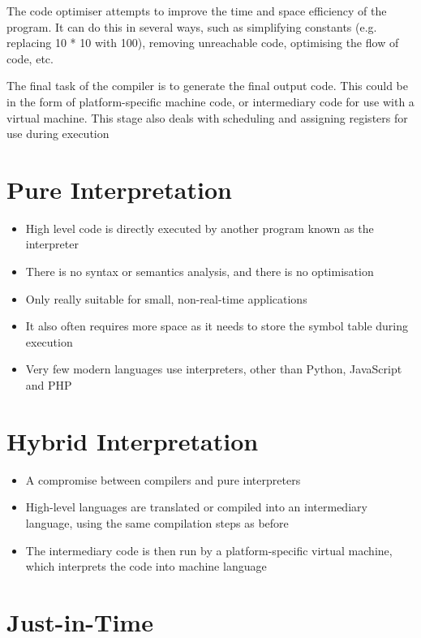 The code optimiser attempts to improve the time and space efficiency of the program. It can do this in several ways,
 such as simplifying constants (e.g. replacing 10 * 10 with 100), removing unreachable code, optimising the flow of
 code, etc.

The final task of the compiler is to generate the final output code. This could be in the form of platform-specific
 machine code, or intermediary code for use with a virtual machine. This stage also deals with scheduling and assigning
 registers for use during execution

\section*{Pure Interpretation}

\begin{itemize}
  \item High level code is directly executed by another program known as the interpreter
  \item There is no syntax or semantics analysis, and there is no optimisation
  \item Only really suitable for small, non-real-time applications
  \item It also often requires more space as it needs to store the symbol table during execution
  \item Very few modern languages use interpreters, other than Python, JavaScript and PHP
\end{itemize}

\section*{Hybrid Interpretation}

\begin{itemize}
  \item A compromise between compilers and pure interpreters
  \item High-level languages are translated or compiled into an intermediary language, using the same compilation steps
   as before
  \item The intermediary code is then run by a platform-specific virtual machine, which interprets the code into machine
   language
\end{itemize}

\section*{Just-in-Time}

